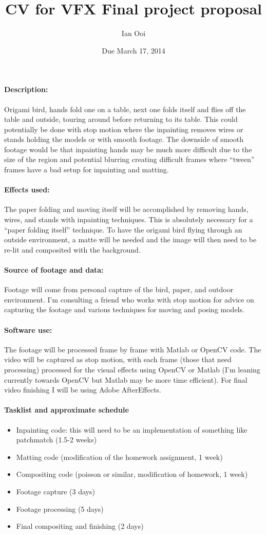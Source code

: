\documentclass[12pt]{article}
\title{CV for VFX Final project proposal}
\author{Ian Ooi}
\date{Due March 17, 2014}
\begin{document}
	\maketitle
	\paragraph{Description:} Origami bird, hands fold one on a table, next one folds itself and flies off the table and outside, touring around before returning to its table.  This could potentially be done with stop motion where the inpainting removes wires or stands holding the models or with smooth footage.  The downside of smooth footage would be that inpainting hands may be much more difficult due to the size of the region and potential blurring creating difficult frames where ``tween'' frames have a bad setup for inpainting and matting.
	\paragraph{Effects used:} The paper folding and moving itself will be accomplished by removing hands, wires, and stands with inpainting techniques.  This is absolutely necessary for a ``paper folding itself'' technique.  To have the origami bird flying through an outside environment, a matte will be needed and the image will then need to be re-lit and composited with the background.
	\paragraph{Source of footage and data:} Footage will come from personal capture of the bird, paper, and outdoor environment.  I'm consulting a friend who works with stop motion for advice on capturing the footage and various techniques for moving and posing models.  
	\paragraph{Software use:} The footage will be processed frame by frame with Matlab or OpenCV code.  The video will be captured as stop motion, with each frame (those that need processing) processed for the visual effects using OpenCV or Matlab (I'm leaning currently towards OpenCV but Matlab may be more time efficient).  For final video finishing I will be using Adobe AfterEffects.
	\paragraph{Tasklist and approximate schedule}
	\begin{itemize}
		\item Inpainting code: this will need to be an implementation of something like patchmatch (1.5-2 weeks)
		\item Matting code (modification of the homework assignment, 1 week)
		\item Compositing code (poisson or similar, modification of homework, 1 week)
		\item Footage capture (3 days)
		\item Footage processing (5 days)
		\item Final compositing and finishing (2 days)
	\end{itemize}
\end{document}
